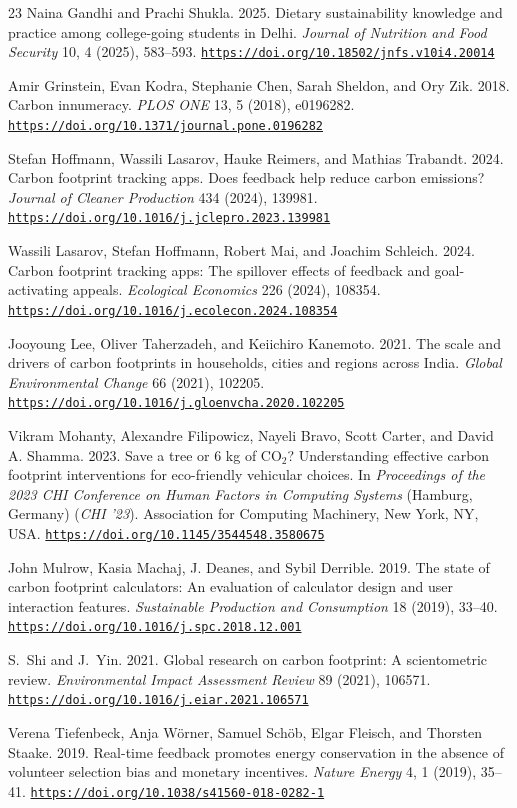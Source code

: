\documentclass[12pt, a4paper]{article}
\newcommand{\doi}[1]{\href{https://doi.org/#1}{\nolinkurl{https://doi.org/#1}}}
\begin{document}
\begin{thebibliography}{23}
Naina Gandhi and Prachi Shukla. 2025. Dietary sustainability knowledge and practice among college-going students in Delhi. \textit{Journal of Nutrition and Food Security} 10, 4 (2025), 583--593. \doi{10.18502/jnfs.v10i4.20014}

Amir Grinstein, Evan Kodra, Stephanie Chen, Sarah Sheldon, and Ory Zik. 2018. Carbon innumeracy. \textit{PLOS ONE} 13, 5 (2018), e0196282. \doi{10.1371/journal.pone.0196282}

Stefan Hoffmann, Wassili Lasarov, Hauke Reimers, and Mathias Trabandt. 2024. Carbon footprint tracking apps. Does feedback help reduce carbon emissions? \textit{Journal of Cleaner Production} 434 (2024), 139981. \doi{10.1016/j.jclepro.2023.139981}

Wassili Lasarov, Stefan Hoffmann, Robert Mai, and Joachim Schleich. 2024. Carbon footprint tracking apps: The spillover effects of feedback and goal-activating appeals. \textit{Ecological Economics} 226 (2024), 108354. \doi{10.1016/j.ecolecon.2024.108354}

Jooyoung Lee, Oliver Taherzadeh, and Keiichiro Kanemoto. 2021. The scale and drivers of carbon footprints in households, cities and regions across India. \textit{Global Environmental Change} 66 (2021), 102205. \doi{10.1016/j.gloenvcha.2020.102205}

Vikram Mohanty, Alexandre Filipowicz, Nayeli Bravo, Scott Carter, and David A. Shamma. 2023. Save a tree or 6 kg of CO$_2$? Understanding effective carbon footprint interventions for eco-friendly vehicular choices. In \textit{Proceedings of the 2023 CHI Conference on Human Factors in Computing Systems} (Hamburg, Germany) (\textit{CHI '23}). Association for Computing Machinery, New York, NY, USA. \doi{10.1145/3544548.3580675}

John Mulrow, Kasia Machaj, J. Deanes, and Sybil Derrible. 2019. The state of carbon footprint calculators: An evaluation of calculator design and user interaction features. \textit{Sustainable Production and Consumption} 18 (2019), 33--40. \doi{10.1016/j.spc.2018.12.001}

S.~Shi and J.~Yin. 2021. Global research on carbon footprint: A scientometric review. \textit{Environmental Impact Assessment Review} 89 (2021), 106571. \doi{10.1016/j.eiar.2021.106571}

Verena Tiefenbeck, Anja W\"{o}rner, Samuel Sch\"{o}b, Elgar Fleisch, and Thorsten Staake. 2019. Real-time feedback promotes energy conservation in the absence of volunteer selection bias and monetary incentives. \textit{Nature Energy} 4, 1 (2019), 35--41. \doi{10.1038/s41560-018-0282-1}

\end{thebibliography}
\end{document}
